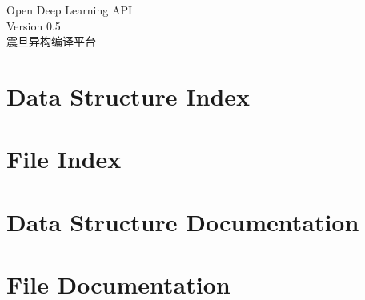 \documentclass[twoside]{book}
\newcommand{\+}{\discretionary{\mbox{\scriptsize$\hookleftarrow$}}{}{}}
\newcommand{\clearemptydoublepage}{%
  \newpage{\pagestyle{empty}\cleardoublepage}%
}
\begin{document}
\hypersetup{pageanchor=false,
             bookmarksnumbered=true,
             pdfencoding=unicode
            }
\begin{titlepage}
\vspace*{7cm}
\begin{center}%
{\Large Open Deep Learning API}\\
\vspace*{1cm}
{\large Version 0.5}\\
\vspace*{2cm}
{\large 震旦异构编译平台} \\
\end{center}
\end{titlepage}
\clearemptydoublepage
{}
\tableofcontents
\clearemptydoublepage
{}
\hypersetup{pageanchor=true}

\chapter{Data Structure Index}

\chapter{File Index}

\chapter{Data Structure Documentation}








\chapter{File Documentation}






































  \backmatter
  \newpage
  \clearemptydoublepage
  \printindex
\end{document}
